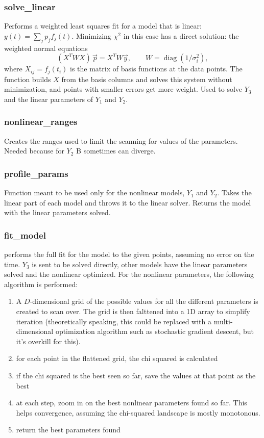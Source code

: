 \subsubsection{solve\_linear}
Performs a weighted least squares fit for a model that is linear: \(y(t)=\sum_j p_j f_j(t)\). Minimizing \(\chi^2\) in this case has a direct solution: the weighted normal equations
\[
    (X^T W X)\,\vec{p} = X^T W \vec{y}, \qquad W = \operatorname{diag}(1/\sigma_i^2),
\]
where \(X_{ij}=f_j(t_i)\) is the matrix of basis functions at the data points. The function builds \(X\) from the basis columns and solves this system without minimization, and points with smaller errors get more weight. Used to solve \(Y_3\) and the linear parameters of \(Y_1\) and \(Y_2\).
\subsubsection{nonlinear\_ranges}
Creates the ranges used to limit the scanning for values of the parameters. Needed because for \(Y_2\) B sometimes can diverge.
\subsubsection{profile\_params}
Function meant to be used only for the nonlinear models, \(Y_1\) and \(Y_2\). Takes the linear part of each model and throws it to the linear solver. Returns the model with the linear parameters solved.
\subsubsection{fit\_model}
performs the full fit for the model to the given points, assuming no error on the time. \(Y_3\) is sent to be solved directly, other models have the linear parameters solved and the nonlinear optimized. For the nonlinear parameters, the following algorithm is performed:
\begin{enumerate}
    \item A \(D\)-dimensional grid of the possible values for all the different parameters is created to scan over. The grid is then falttened into a 1D array to simplify iteration (theoretically speaking, this could be replaced with a multi-dimensional optimization algorithm such as stochastic gradient descent, but it's overkill for this).
    \item for each point in the flattened grid, the chi squared is calculated
    \item if the chi squared is the best seen so far, save the values at that point as the best
    \item at each step, zoom in on the best nonlinear parameters found so far. This helps convergence, assuming the chi-squared landscape is mostly monotonous.
    \item return the best parameters found
\end{enumerate}
